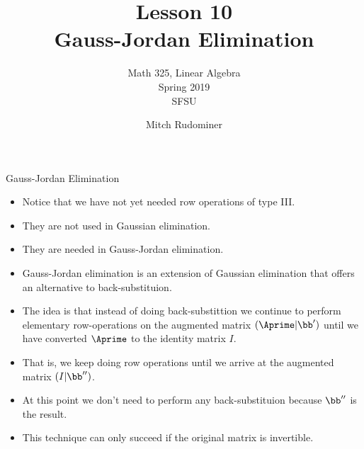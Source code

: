 \documentclass{beamer}
\title{Lesson 10\\ Gauss-Jordan Elimination}
\subtitle{Math 325, Linear Algebra \\ Spring 2019 \\ SFSU}
\author{Mitch Rudominer}
\date{}
\begin{document}
\begin{frame}
  \titlepage
\end{frame}


\begin{frame}{Gauss-Jordan Elimination}

\begin{itemize}
\item Notice that we have not yet needed row operations of type III.
\item They are not used in Gaussian elimination.
\item They are needed in Gauss-Jordan elimination.
\item Gauss-Jordan elimination is an extension of Gaussian elimination that
offers an alternative to back-substituion.
\item The idea is that instead of doing back-substittion we continue to
perform elementary row-operations on the augmented matrix $(\Aprime \vert \bb^{\prime})$
until we have converted $\Aprime$ to the identity matrix $I$.
\item That is, we keep doing row operations until we arrive at the augmented
matrix $(I \vert \bb^{\prime\prime})$.
\item At this point we don't need to perform any back-substituion because $\bb^{\prime\prime}$
is the result.
\item This technique can only succeed if the original matrix is invertible.
\end{itemize}

\end{frame}


\end{document}
